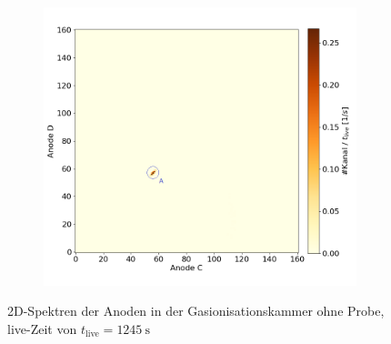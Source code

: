 \begin{figure}[H]
\begin{subfigure}{0.47\textwidth}
    \end{subfigure}
    \begin{subfigure}{0.47\textwidth}
        \centering
        \includegraphics[width=\linewidth]{Pictures/Gasdetektor/3_blank_CD.png}
    \end{subfigure}
    \caption{2D-Spektren der Anoden in der Gasionisationskammer ohne Probe, live-Zeit von $t_{\text{live}} = \SI{1245}{\second}$}
    \label{Auswertung_Gasdetektor_2DSpektren_blank}
\end{figure}
